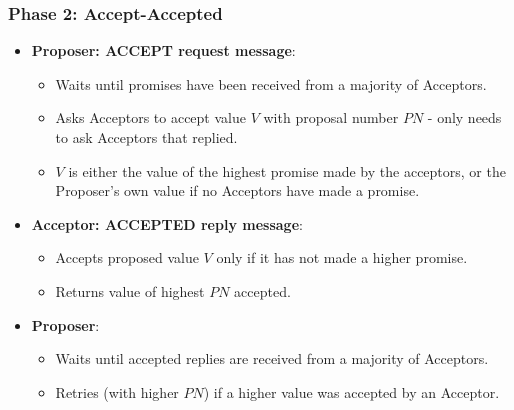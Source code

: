 \documentclass[11pt]{article}
\begin{document}
\subsubsection{Phase 2: Accept-Accepted}
\begin{itemize}
  \item \textbf{Proposer: ACCEPT request message}:
    \begin{itemize}
      \item Waits until promises have been received from a majority of Acceptors.
      \item Asks Acceptors to accept value $V$ with proposal number $PN$ - only needs to ask Acceptors that replied.
      \item $V$ is either the value of the highest promise made by the acceptors, or the Proposer's  own value if no Acceptors have made a promise.
    \end{itemize}
  \item \textbf{Acceptor: ACCEPTED reply message}:
    \begin{itemize}
      \item Accepts proposed value $V$ only if it has not made a higher promise.
      \item Returns value of highest $PN$ accepted.
    \end{itemize}
  \item \textbf{Proposer}:
    \begin{itemize}
      \item Waits until accepted replies are received from a majority of Acceptors.
      \item Retries (with higher $PN$) if a higher value was accepted by an Acceptor.
    \end{itemize}
\end{itemize}
\end{document}
